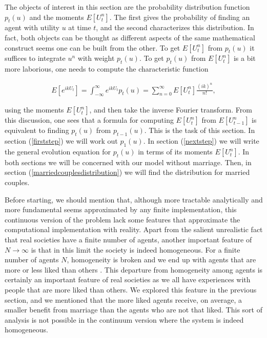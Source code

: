 \documentclass[12pt]{article}
\begin{document}
The objects of interest in this section are the probability distribution function $p_t(u)$ and the moments $E[U_t^n]$. The first gives the probability of finding an agent with utility $u$ at time $t$, and the second characterizes this distribution. In fact, both objects can be thought as different aspects of the same mathematical construct seems one can be built from the other. To get $E[U_t^n]$ from $p_t(u)$ it suffices to integrate $u^n$ with weight $p_t(u)$. To get $p_t(u)$ from $E[U_t^n]$ is a bit more laborious, one needs to compute the characteristic function

\begin{align}
    E[e^{ik U_t}]=\int_{-\infty}^{\infty} e^{ik U_t}p_t(u)=\sum_{n=0}^\infty E[U_t^n]\frac{(ik)^n}{n!},
    \label{characteristicfunction}
\end{align}

\noindent using the moments $E[U_t^n]$, and then take the inverse Fourier transform. From this discussion, one sees that a formula for computing $E[U_{t}^n]$ from $E[U_{t-1}^n]$ is equivalent to finding $p_t(u)$ from $p_{t-1}(u)$. This is the task of this section. In section (\ref{firststep}) we will work out $p_1(u)$. In section (\ref{nextstep}) we will write the general evolution equation for $p_t(u)$ in terms of its moments $E[U_t^n]$. In both sections we will be concerned with our model without marriage. Then, in section (\ref{marriedcouplesdistribution}) we will find the distribution for married couples.

Before starting, we should mention that, although more tractable analytically and more fundamental seems approximated by any finite implementation, this continuous version of the problem lack some features that approximate the computational implementation with reality. Apart from the salient unrealistic fact that real societies have a finite number of agents, another important feature of $N\rightarrow\infty$ is that in this limit the society is indeed homogeneous. For a finite number of agents $N$, homogeneity is broken and we end up with agents that are more or less liked than others %
. This departure from homogeneity among agents is certainly an important feature of real societies as we all have experiences with people that are more liked than others. We explored this feature in the previous section, and we mentioned that the more liked agents receive, on average, a smaller benefit from marriage than the agents who are not that liked. This sort of analysis is not possible in the continuum version where the system is indeed homogeneous. 
\end{document}
